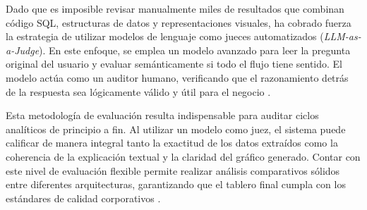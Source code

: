 Dado que es imposible revisar manualmente miles de resultados que combinan
código SQL, estructuras de datos y representaciones visuales, ha cobrado fuerza
la estrategia de utilizar modelos de lenguaje como jueces automatizados
(\textit{LLM-as-a-Judge}). En este enfoque, se emplea un modelo avanzado para
leer la pregunta original del usuario y evaluar semánticamente si todo el flujo
tiene sentido. El modelo actúa como un auditor humano, verificando que el
razonamiento detrás de la respuesta sea lógicamente válido y útil para el
negocio \citep{Jaisinghani2024}.

Esta metodología de evaluación resulta indispensable para auditar ciclos
analíticos de principio a fin. Al utilizar un modelo como juez, el sistema
puede calificar de manera integral tanto la exactitud de los datos extraídos
como la coherencia de la explicación textual y la claridad del gráfico generado.
Contar con este nivel de evaluación flexible permite realizar análisis
comparativos sólidos entre diferentes arquitecturas, garantizando que el tablero
final cumpla con los estándares de calidad corporativos \citep{Jaisinghani2024}.